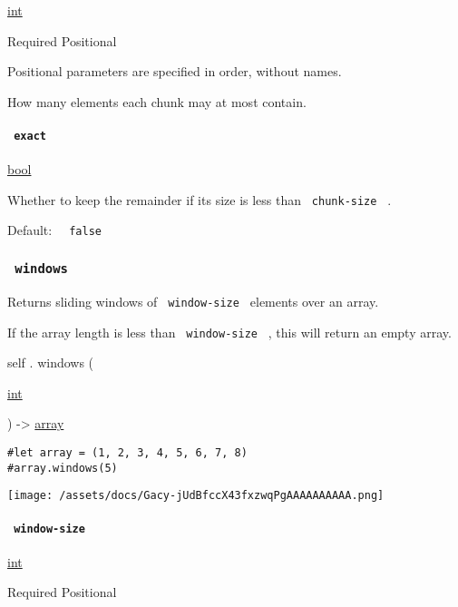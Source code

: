 \href{/docs/reference/foundations/int/}{int}

{Required} {{ Positional }}

\label{definitions-chunks-chunk-size-positional-tooltip}
Positional parameters are specified in order, without names.

How many elements each chunk may at most contain.

\paragraph{\texorpdfstring{\texttt{\ exact\ }}{ exact }}\label{definitions-chunks-exact}

\href{/docs/reference/foundations/bool/}{bool}

Whether to keep the remainder if its size is less than
\texttt{\ chunk-size\ } .

Default: \texttt{\ }{\texttt{\ false\ }}\texttt{\ }

\subsubsection{\texorpdfstring{\texttt{\ windows\ }}{ windows }}\label{definitions-windows}

Returns sliding windows of \texttt{\ window-size\ } elements over an
array.

If the array length is less than \texttt{\ window-size\ } , this will
return an empty array.

self { . } { windows } (

{ \href{/docs/reference/foundations/int/}{int} }

) -\textgreater{} \href{/docs/reference/foundations/array/}{array}

\begin{verbatim}
#let array = (1, 2, 3, 4, 5, 6, 7, 8)
#array.windows(5)
\end{verbatim}

\texttt{[image: /assets/docs/Gacy-jUdBfccX43fxzwqPgAAAAAAAAAA.png]}

\paragraph{\texorpdfstring{\texttt{\ window-size\ }}{ window-size }}\label{definitions-windows-window-size}

\href{/docs/reference/foundations/int/}{int}

{Required} {{ Positional }}

